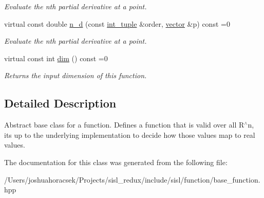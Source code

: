 \begin{DoxyCompactItemize}
\begin{DoxyCompactList}\small\item\em Evaluate the n\textquotesingle{}th partial derivative at a point. \end{DoxyCompactList}\item 
\mbox{\label{classsisl_1_1function_ae7609877344e1b150638bfdc1f312a6e}} 
virtual const double \hyperlink{classsisl_1_1function_ae7609877344e1b150638bfdc1f312a6e}{n\+\_\+d} (const \hyperlink{namespacesisl_adc492e1c166a136d08b283394d81cd71}{int\+\_\+tuple} \&order, \hyperlink{namespacesisl_a2069bd5374a9be042ff3ce3306d41e1a}{vector} \&p) const =0
\begin{DoxyCompactList}\small\item\em Evaluate the n\textquotesingle{}th partial derivative at a point. \end{DoxyCompactList}\item 
\mbox{\label{classsisl_1_1function_abad7dc378805d859b1afa020565828be}} 
virtual const int \hyperlink{classsisl_1_1function_abad7dc378805d859b1afa020565828be}{dim} () const =0
\begin{DoxyCompactList}\small\item\em Returns the input dimension of this function. \end{DoxyCompactList}\end{DoxyCompactItemize}


\subsection{Detailed Description}
Abstract base class for a function. Defines a function that is valid over all R$^\wedge$n, it\textquotesingle{}s up to the underlying implementation to decide how those values map to real values. 

The documentation for this class was generated from the following file\+:\begin{DoxyCompactItemize}
\item 
/\+Users/joshuahoracsek/\+Projects/sisl\+\_\+redux/include/sisl/function/base\+\_\+function.\+hpp\end{DoxyCompactItemize}
